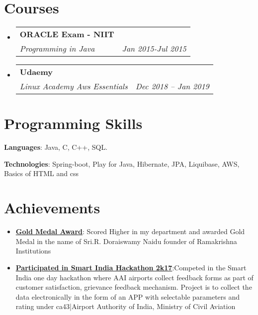 \documentclass[letterpaper,12pt]{article}
\makeatletter
\newcommand{\resumeItem}[2]{
  \item\small{
    \textbf{#1}{:#2 \vspace{-2pt}}
  }
}
\newcommand{\resumeSubheading}[4]{
  \vspace{-1pt}\item
    \begin{tabular*}{0.97\textwidth}{l@{\extracolsep{\fill}}r}
      \textbf{#1} & #2 \\
      \textit{\small#3} & \textit{\small #4} \\
    \end{tabular*}\vspace{-5pt}
}
\newcommand{\resumeSubItem}[2]{\resumeItem{#1}{#2}\vspace{-4pt}}
\newcommand{\resumeSubHeadingListStart}{\begin{itemize}[leftmargin=*]}
\newcommand{\resumeSubHeadingListEnd}{\end{itemize}}
\makeatother
\begin{document}
\section{Courses}
  \resumeSubHeadingListStart
  \resumeSubheading
      {ORACLE Exam - NIIT}{}
      {Programming in Java}{Jan 2015-Jul 2015}
  \resumeSubHeadingListEnd

  \resumeSubHeadingListStart
    \resumeSubheading
      {Udaemy}{}
      {Linux Academy Aws Essentials}{Dec 2018 -- Jan 2019}
  \resumeSubHeadingListEnd
  

\section{Programming Skills}
  \resumeSubHeadingListStart
    \item{
      \textbf{Languages}{: Java, C, C++, SQL.}
    \item
      \textbf{Technologies}{: Spring-boot, Play for Java, Hibernate, JPA, Liquibase, AWS, Basics of HTML and css}
    }
  \resumeSubHeadingListEnd



\section{Achievements}
  \resumeSubHeadingListStart
    \resumeSubItem {\href{https://drive.google.com/file/d/0ByYNj-1udG4iTFU4czFnWGo1b2M/view}{Gold Medal Award}}
      { Scored Higher in my department and awarded Gold Medal in the name of Sri.R. Doraiswamy Naidu founder of Ramakrishna Institutions }
    \resumeSubItem{\href{https://drive.google.com/file/d/0B1MYSgkEaqi2TU04RUtzTWp4bHVQMndlY1M4alZ1T1F3TzJF/view?usp=sharing}{Participated in Smart India Hackathon 2k17}}{Competed in the Smart India one day hackathon where AAI airports collect feedback forms as part of customer satisfaction, grievance feedback mechanism. Project is to collect the data electronically in the form of an APP with selectable parameters and rating under ca43|Airport Authority of India, Ministry of Civil Aviation}
    \resumeSubHeadingListEnd
\end{document}
